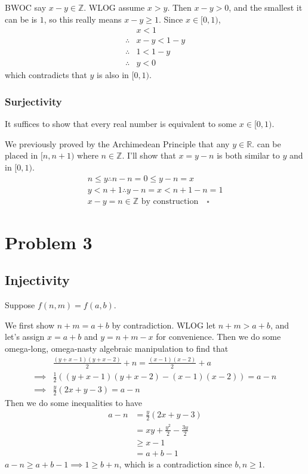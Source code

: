 \documentclass[12pt]{article}
\newcommand{\R}{\mathbb{R}}
\newcommand{\Z}{\mathbb{Z}}
\begin{document}
BWOC say $x-y \in \Z$.
WLOG assume $x > y$.
Then $x-y>0$, and the smallest it can be is $1$,
so this really means $x-y \ge 1$.
Since $x \in [0, 1)$,
\begin{align*}
               & x < 1     \\
  \therefore{} & x-y < 1-y \\
  \therefore{} & 1 < 1-y   \\
  \therefore{} & y < 0
\end{align*}
which contradicts that $y$ is also in $[0, 1)$.

\subsubsection{Surjectivity}

It suffices to show that every real number is equivalent to some $x \in [0, 1)$.

We previously proved by the Archimedean Principle that any $y \in \R$.
can be placed in $[n, n+1)$ where $n \in \Z$.
I'll show that $x=y-n$ is both similar to $y$ and in $[0, 1)$.
\begin{gather*}
  n \le y \therefore n-n=0 \le y-n=x \\
  y < n+1 \therefore y-n=x < n+1-n=1 \\
  x-y=n \in \Z\text{ by construction}\quad\square
\end{gather*}

\section{Problem 3}

\subsection{Injectivity}

Suppose $f(n, m)=f(a, b)$.

We first show $n+m=a+b$ by contradiction.
WLOG let $n+m > a+b$, and let's assign $x=a+b$ and $y=n+m-x$ for convenience.
Then we do some omega-long, omega-nasty algebraic manipulation to find that
\begin{align*}
  & \frac{(y+x-1)(y+x-2)}{2}+n=\frac{(x-1)(x-2)}{2}+a \\
  \implies{} & \frac{1}{2}((y+x-1)(y+x-2)-(x-1)(x-2))=a-n \\
  \implies{} & \frac{y}{2}(2x+y-3)=a-n
\end{align*}
Then we do some inequalities to have
\begin{align*}
  a-n
  &= \frac{y}{2}(2x+y-3) \\
  &= xy+\frac{y^2}{2}-\frac{3y}{2} \\
  &\ge x-1 \\
  &= a+b-1
\end{align*}
$a-n \ge a+b-1 \implies 1 \ge b+n$, which is a contradiction since $b, n \ge 1$.
\end{document}
